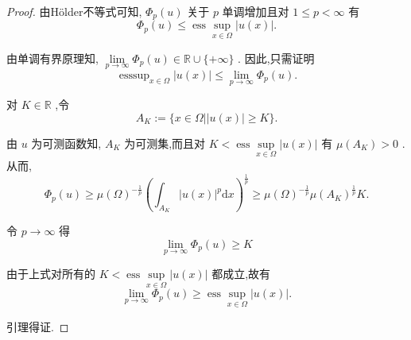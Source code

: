 \documentclass[lang=cn,newtx,10pt,scheme=chinese,thmcnt=chapter]{elegantbook}
\newcommand{\dif}{\mathrm{d}}
\begin{document}
\begin{proof}
    由Hölder不等式可知, \({\Phi }_{p}\left( u\right)\) 关于 \(p\) 单调增加且对 \(1 \leqslant  p < \infty\) 有
\begin{equation*}
{\Phi }_{p}\left( u\right)  \leqslant  \operatorname{ess}\mathop{\sup }\limits_{{x \in  \Omega }}\left| {u\left( x\right) }\right| .
\end{equation*}

由单调有界原理知, \(\mathop{\lim }\limits_{{p \rightarrow  \infty }}{\Phi }_{p}\left( u\right)  \in  \mathbb{R} \cup  \{  + \infty \}\) . 因此,只需证明
\begin{equation*}
{\operatorname{esssup}}_{x \in  \Omega }\left| {u\left( x\right) }\right|  \leqslant  \mathop{\lim }\limits_{{p \rightarrow  \infty }}{\Phi }_{p}\left( u\right) .
\end{equation*}

对 \(K \in  \mathbb{R}\) ,令
\begin{equation*}
{A}_{K} \mathrel{\text{ := }} \{ x \in  \Omega \left| \right| u\left( x\right)  \mid   \geq  K\} .
\end{equation*}

由 \(u\) 为可测函数知, \({A}_{K}\) 为可测集,而且对 \(K < \operatorname{ess}\mathop{\sup }\limits_{{x \in  \Omega }}\left| {u\left( x\right) }\right|\) 有 \(\mu \left( {A}_{K}\right)  > 0\) . 从而,
\begin{equation*}
{\Phi }_{p}\left( u\right)  \geq  \mu {\left( \Omega \right) }^{-\frac{1}{p}}{\left( {\int }_{{A}_{K}}{\left| u\left( x\right) \right| }^{p}\dif x\right) }^{\frac{1}{p}} \geq  \mu {\left( \Omega \right) }^{-\frac{1}{p}}\mu {\left( {A}_{K}\right) }^{\frac{1}{p}}K.
\end{equation*}

令 \(p \rightarrow  \infty\) 得
\begin{equation*}
\mathop{\lim }\limits_{{p \rightarrow  \infty }}{\Phi }_{p}\left( u\right)  \geq  K
\end{equation*}

由于上式对所有的 \(K < \operatorname{ess}\mathop{\sup }\limits_{{x \in  \Omega }}\left| {u\left( x\right) }\right|\) 都成立,故有
\begin{equation*}
\mathop{\lim }\limits_{{p \rightarrow  \infty }}{\Phi }_{p}\left( u\right)  \geq  \operatorname{ess}\mathop{\sup }\limits_{{x \in  \Omega }}\left| {u\left( x\right) }\right| .
\end{equation*}

引理得证.

\end{proof}
\end{document}
